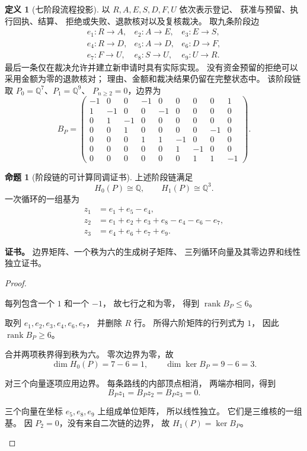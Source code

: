 \documentclass[UTF8,12pt,a4paper,openany,fontset=none,zihao=false]{ctexrep}
\theoremstyle{definition}
\newtheorem{definition}{定义}[chapter]
\newtheorem{proposition}{命题}[chapter]
\newenvironment{certificate}{\par\noindent\textbf{证书。}\ignorespaces}{\par}
\newcommand{\1}{\mathbf 1}
\begin{document}
\begin{definition}[七阶段流程投影]
\label{std:phase}
以 \(R,A,E,S,D,F,U\) 依次表示登记、
获准与预留、执行回执、结算、
拒绝或失败、退款核对以及复核裁决。
取九条阶段边
\[
\begin{array}{lll}
e_1:R\to A,&e_2:A\to E,&e_3:E\to S,\\
e_4:R\to D,&e_5:A\to D,&e_6:D\to F,\\
e_7:F\to U,&e_8:S\to U,&e_9:U\to R.
\end{array}
\]
最后一条仅在裁决允许并建立新申请时具有实际实现。
没有资金预留的拒绝可以采用金额为零的退款核对；
理由、金额和裁决结果仍留在完整状态中。
该阶段链取 \(P_0=\mathbb Q^7\)、\(P_1=\mathbb Q^9\)、
\(P_{n\ge2}=0\)，边界为
\[
B_P=
\begin{pmatrix}
-1&0&0&-1&0&0&0&0&1\\
1&-1&0&0&-1&0&0&0&0\\
0&1&-1&0&0&0&0&0&0\\
0&0&1&0&0&0&0&-1&0\\
0&0&0&1&1&-1&0&0&0\\
0&0&0&0&0&1&-1&0&0\\
0&0&0&0&0&0&1&1&-1
\end{pmatrix}.
\]
\end{definition}

\begin{proposition}[阶段链的可计算同调证书]
\label{std:phase-homology}
上述阶段链满足
\[
H_0(P)\cong\mathbb Q,\qquad H_1(P)\cong\mathbb Q^3.
\]
一次循环的一组基为
\[
\begin{aligned}
z_1&=e_1+e_5-e_4,\\
z_2&=e_1+e_2+e_3+e_8-e_4-e_6-e_7,\\
z_3&=e_4+e_6+e_7+e_9.
\end{aligned}
\]
\end{proposition}
\begin{certificate}
边界矩阵、一个秩为六的生成树子矩阵、
三列循环向量及其零边界和线性独立证书。
\end{certificate}
\begin{proof}
\begin{semanticsteps}
\item 每列包含一个 \(1\) 和一个 \(-1\)，
故七行之和为零，
得到 \(\operatorname{rank}B_P\le6\)。
\item 取列 \(e_1,e_2,e_3,e_4,e_6,e_7\)，
并删除 \(R\) 行。
所得六阶矩阵的行列式为 \(1\)，
因此 \(\operatorname{rank}B_P\ge6\)。
\item 合并两项秩界得到秩为六。
零次边界为零，故
\[
\dim H_0(P)=7-6=1,\qquad
\dim\ker B_P=9-6=3.
\]
\item 对三个向量逐项应用边界。
每条路线的内部顶点相消，
两端亦相同，得到
\[
B_Pz_1=B_Pz_2=B_Pz_3=0.
\]
\item 三个向量在坐标 \(e_5,e_8,e_9\) 上组成单位矩阵，
所以线性独立。
它们是三维核的一组基。
因 \(P_2=0\)，没有来自二次链的边界，
故 \(H_1(P)=\ker B_P\)。
\end{semanticsteps}
\end{proof}
\end{document}
